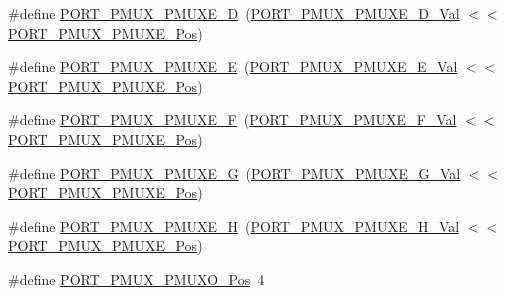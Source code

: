 \begin{DoxyCompactItemize}
\item 
\#define \mbox{\hyperlink{group___s_a_m_d21___p_o_r_t_ga8db62e7045ce8186a3e3c84408fec41f}{P\+O\+R\+T\+\_\+\+P\+M\+U\+X\+\_\+\+P\+M\+U\+X\+E\+\_\+D}}~(\mbox{\hyperlink{group___s_a_m_d21___p_o_r_t_ga934efa06dffb41353e14a0d649351797}{P\+O\+R\+T\+\_\+\+P\+M\+U\+X\+\_\+\+P\+M\+U\+X\+E\+\_\+\+D\+\_\+\+Val}}         $<$$<$ \mbox{\hyperlink{group___s_a_m_d21___p_o_r_t_ga38a4c4871ecabeb4ad36398b73685bac}{P\+O\+R\+T\+\_\+\+P\+M\+U\+X\+\_\+\+P\+M\+U\+X\+E\+\_\+\+Pos}})
\item 
\#define \mbox{\hyperlink{group___s_a_m_d21___p_o_r_t_ga4254995439f919e403cb2f6f2a9a726b}{P\+O\+R\+T\+\_\+\+P\+M\+U\+X\+\_\+\+P\+M\+U\+X\+E\+\_\+E}}~(\mbox{\hyperlink{group___s_a_m_d21___p_o_r_t_gaea30c71f5bc91714c57780b5ff2b2211}{P\+O\+R\+T\+\_\+\+P\+M\+U\+X\+\_\+\+P\+M\+U\+X\+E\+\_\+\+E\+\_\+\+Val}}         $<$$<$ \mbox{\hyperlink{group___s_a_m_d21___p_o_r_t_ga38a4c4871ecabeb4ad36398b73685bac}{P\+O\+R\+T\+\_\+\+P\+M\+U\+X\+\_\+\+P\+M\+U\+X\+E\+\_\+\+Pos}})
\item 
\#define \mbox{\hyperlink{group___s_a_m_d21___p_o_r_t_ga35ca2fd02cfd84af0d0a2d1f417bc342}{P\+O\+R\+T\+\_\+\+P\+M\+U\+X\+\_\+\+P\+M\+U\+X\+E\+\_\+F}}~(\mbox{\hyperlink{group___s_a_m_d21___p_o_r_t_ga7ef931d6a0d370d5ee0b1b4eb87c5e80}{P\+O\+R\+T\+\_\+\+P\+M\+U\+X\+\_\+\+P\+M\+U\+X\+E\+\_\+\+F\+\_\+\+Val}}         $<$$<$ \mbox{\hyperlink{group___s_a_m_d21___p_o_r_t_ga38a4c4871ecabeb4ad36398b73685bac}{P\+O\+R\+T\+\_\+\+P\+M\+U\+X\+\_\+\+P\+M\+U\+X\+E\+\_\+\+Pos}})
\item 
\#define \mbox{\hyperlink{group___s_a_m_d21___p_o_r_t_ga2fc8ecf2f999e23a5bfd539423bb9286}{P\+O\+R\+T\+\_\+\+P\+M\+U\+X\+\_\+\+P\+M\+U\+X\+E\+\_\+G}}~(\mbox{\hyperlink{group___s_a_m_d21___p_o_r_t_gaf640a2651a423568c43db1fe4f09296c}{P\+O\+R\+T\+\_\+\+P\+M\+U\+X\+\_\+\+P\+M\+U\+X\+E\+\_\+\+G\+\_\+\+Val}}         $<$$<$ \mbox{\hyperlink{group___s_a_m_d21___p_o_r_t_ga38a4c4871ecabeb4ad36398b73685bac}{P\+O\+R\+T\+\_\+\+P\+M\+U\+X\+\_\+\+P\+M\+U\+X\+E\+\_\+\+Pos}})
\item 
\#define \mbox{\hyperlink{group___s_a_m_d21___p_o_r_t_gad9686d726a7681fc752c67ed7ab3a38d}{P\+O\+R\+T\+\_\+\+P\+M\+U\+X\+\_\+\+P\+M\+U\+X\+E\+\_\+H}}~(\mbox{\hyperlink{group___s_a_m_d21___p_o_r_t_ga19bc58bfed10fdb5eb07d690e361bc73}{P\+O\+R\+T\+\_\+\+P\+M\+U\+X\+\_\+\+P\+M\+U\+X\+E\+\_\+\+H\+\_\+\+Val}}         $<$$<$ \mbox{\hyperlink{group___s_a_m_d21___p_o_r_t_ga38a4c4871ecabeb4ad36398b73685bac}{P\+O\+R\+T\+\_\+\+P\+M\+U\+X\+\_\+\+P\+M\+U\+X\+E\+\_\+\+Pos}})
\item 
\#define \mbox{\hyperlink{group___s_a_m_d21___p_o_r_t_ga80a28619ad2db553b64d4ce4545368d3}{P\+O\+R\+T\+\_\+\+P\+M\+U\+X\+\_\+\+P\+M\+U\+X\+O\+\_\+\+Pos}}~4
$$
\end{DoxyCompactItemize}
